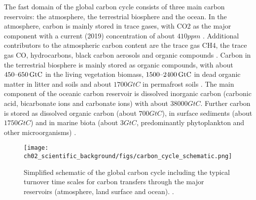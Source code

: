The fast domain of the global carbon cycle consists of three main carbon
reservoirs: the atmosphere, the terrestrial biosphere and the ocean. In the
atmosphere, carbon is mainly stored in trace gases, with \ac{CO2} as the major
component with a current (2019) concentration of about $410 \unit{ppm}$
\autocite{Friedlingstein2020}. Additional contributors to the atmospheric
carbon content are the trace gas \ac{CH4}, the trace gas \ac{CO}, hydrocarbons,
black carbon aerosols and organic compounds \autocite{Ciais2013}. Carbon in the
terrestrial biosphere is mainly stored as organic compounds, with about
$\rangeunit{450}{650}{GtC}$ in the living vegetation biomass,
$\rangeunit{1500}{2400}{GtC}$ in dead organic matter in litter and soils and
about $1700 \unit{GtC}$ in permafrost soils \autocite{Ciais2013}. The main
component of the oceanic carbon reservoir is dissolved inorganic carbon
(carbonic acid, bicarbonate ions and carbonate ions) with about $38000
\unit{GtC}$. Further carbon is stored as dissolved organic carbon (about $700
\unit{GtC}$), in surface sediments (about $1750 \unit{GtC}$) and in marine
biota (about $3 \unit{GtC}$, predominantly phytoplankton and other
microorganisms) \autocite{Ciais2013, Friedlingstein2020}.

\begin{figure}[t]
  \centering
  \texttt{[image: 
    ch02\_scientific\_background/figs/carbon\_cycle\_schematic.png]}
  \caption{Simplified schematic of the global carbon cycle including the
    typical turnover time scales for carbon transfers through the major
    reservoirs (atmosphere, land surface and ocean).
    .}
  \label{fig:02:carbon_cycle_schematic}
\end{figure}

